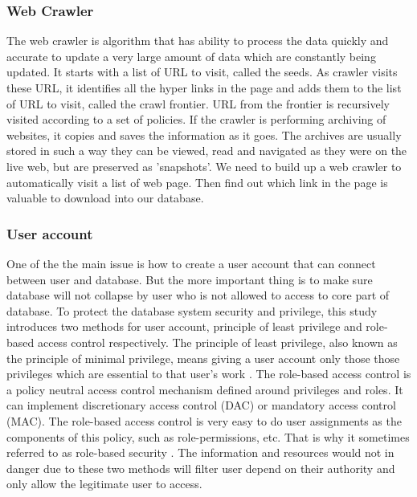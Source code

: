 \subsubsection*{Web Crawler}
The web crawler is algorithm that has ability to process the data quickly and accurate to update a very large amount of data which are constantly being updated.\cite{Liu2012} It starts with a list of URL to visit, called the seeds. As crawler visits these URL, it identifies all the hyper links in the page and adds them to the list of URL to visit, called the crawl frontier. URL from the frontier is recursively visited according to a set of policies. If the crawler is performing archiving of websites, it copies and saves the information as it goes. The archives are usually stored in such a way they can be viewed, read and navigated as they were on the live web, but are preserved as 'snapshots'.\cite{Du2013} We need to build up a web crawler to automatically visit a list of web page. Then find out which link in the page is valuable to download into our database.
	
	
\subsubsection*{User account}
One of the the main issue is how to create a user account that can connect between user and database. But the more important thing is to make sure database will not collapse by user who is not allowed to access to core part of database. 
 To protect the database system security and privilege, this study introduces two methods for user account, principle of least privilege and role-based access control respectively. The principle of least privilege, also known as the principle of minimal privilege, means giving a user account only those those privileges which are essential to that user's work \cite{PrincipleLeastPrivilege}. The role-based access control is a policy neutral access control mechanism defined around privileges and roles. It can implement discretionary access control (DAC) or mandatory access control (MAC). The role-based access control is very easy to do user assignments as the components of this policy, such as role-permissions, etc. That is why it sometimes referred to as role-based security \cite{RoleBasedAccessControl}. The information and resources would not in danger due to these two methods will filter user depend on their authority and only allow the legitimate user to access. 
	
	
